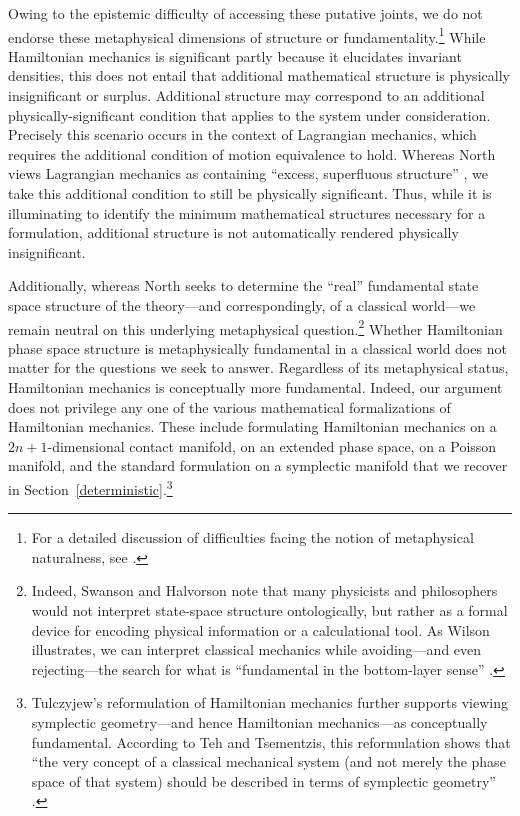 \documentclass[12pt, twoside]{article}
\begin{document}
Owing to the epistemic difficulty of accessing these putative joints, we do not endorse these metaphysical dimensions of structure or fundamentality.\footnote{For a detailed discussion of difficulties facing the notion of metaphysical naturalness, see \textcites[]{Dorr_Hawthorne}.} While Hamiltonian mechanics is significant partly because it elucidates invariant densities, this does not entail that additional mathematical structure is physically insignificant or surplus. Additional structure may correspond to an additional physically-significant condition that applies to the system under consideration. Precisely this scenario occurs in the context of Lagrangian mechanics, which requires the additional condition of motion equivalence to hold. Whereas North views Lagrangian mechanics as containing ``excess, superfluous structure'' \parencites*[75]{North}, we take this additional condition to still be physically significant. Thus, while it is illuminating to identify the minimum mathematical structures necessary for a formulation, additional structure is not automatically rendered physically insignificant. 

Additionally, whereas North \parencites*[76]{North} seeks to determine the ``real'' fundamental state space structure of the theory---and correspondingly, of a classical world---we remain neutral on this underlying metaphysical question.\footnote{Indeed, Swanson and Halvorson \parencites*[]{Swanson} note that many physicists and philosophers would not interpret state-space structure ontologically, but rather as a formal device for encoding physical information or a calculational tool. As Wilson illustrates, we can interpret classical mechanics while avoiding---and even rejecting---the search for what is ``fundamental in the bottom-layer sense'' \parencites*[53]{Wilson}.} Whether Hamiltonian phase space structure is metaphysically fundamental in a classical world does not matter for the questions we seek to answer. Regardless of its metaphysical status, Hamiltonian mechanics is conceptually more fundamental. Indeed, our argument does not privilege any one of the various mathematical formalizations of Hamiltonian mechanics. These include formulating Hamiltonian mechanics on a $2n+1$-dimensional contact manifold, on an extended phase space, on a Poisson manifold, and the standard formulation on a symplectic manifold that we recover in Section~\ref{deterministic}.\footnote{Tulczyjew's reformulation of Hamiltonian mechanics further supports viewing symplectic geometry---and hence Hamiltonian mechanics---as conceptually fundamental. According to Teh and Tsementzis, this reformulation shows that  ``the very concept of a classical mechanical system (and not merely the phase space of that system) should be described in terms of symplectic geometry'' \parencites*[46]{Teh}.}
\end{document}

